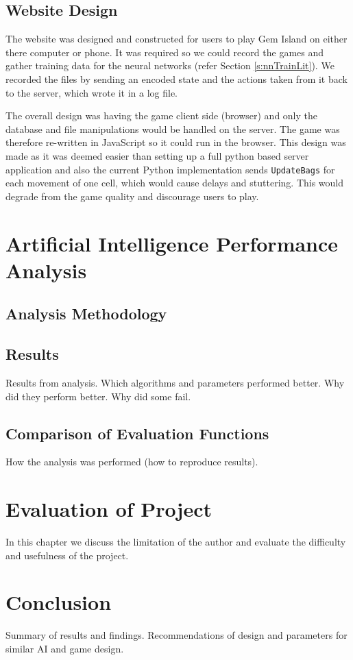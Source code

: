 \documentclass{bhamthesis}
\theoremstyle{definition}
\begin{document}
\section{Website Design}\label{s:website}

The website was designed and constructed for users to play Gem Island on either there computer or phone. It was required so we could record the games and gather training data for the neural networks (refer Section \ref{s:nnTrainLit}). We recorded the files by sending an encoded state and the actions taken from it back to the server, which wrote it in a log file.

The overall design was having the game client side (browser) and only the database and file manipulations would be handled on the server. The game was therefore re-written in JavaScript so it could run in the browser. This design was made as it was deemed easier than setting up a full python based server application and also the current Python implementation sends \verb|UpdateBags| for each movement of one cell, which would cause delays and stuttering. This would degrade from the game quality and discourage users to play.


\chapter{Artificial Intelligence Performance Analysis}
\section{Analysis Methodology}
\section{Results}
Results from analysis. \cite{Browne2012}
Which algorithms and parameters performed better.
Why did they perform better.
Why did some fail.
\section{Comparison of Evaluation Functions}
How the analysis was performed (how to reproduce results).


\chapter{Evaluation of Project}
In this chapter we discuss the limitation of the author and evaluate the difficulty and usefulness of the project.

\chapter{Conclusion}
Summary of results and findings. Recommendations of design and parameters for similar AI and game design.
\end{document}
